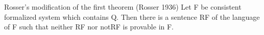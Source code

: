 \documentclass[letterpaper, 12pt]{article}
\begin{document}
Rosser's modification of the first theorem (Rosser 1936)
Let F be consistent formalized system which contains Q. 
Then there is a sentence RF of the language of F such that 
neither RF nor notRF is provable in F.

\end{document}
